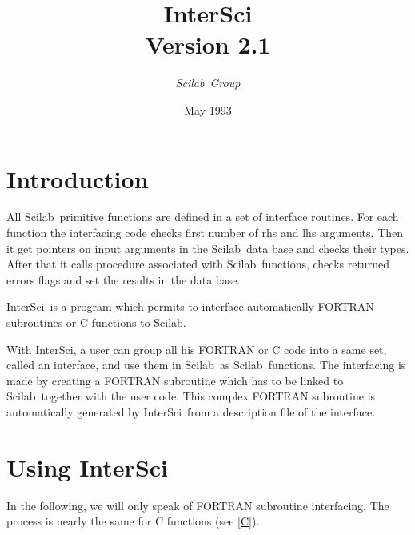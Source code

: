 \textheight=660pt \textwidth=470pt
\topmargin=-27pt
\oddsidemargin=0pt \evensidemargin=0pt \marginparwidth=60pt

\newcommand{\version}{Version 2.1}
\newcommand{\ISCI}{InterSci}
\newcommand{\SCI}{Scilab}
\newcommand{\T}[1]{{\tt #1}}
\newcommand{\M}[1]{$<${\em #1}$>$}
\newcommand{\ie}{\mbox{i.e.}}

\title{{\Huge\bf\ISCI}\\{\normalsize \version}}
\author{\Large\sl\SCI\ Group}
\date{May 1993}



\pagestyle{myheadings}
\markright{\ISCI\ \version}

\maketitle

\section{Introduction}
All \SCI\ primitive functions are defined in a set of interface
routines. For each function the interfacing code checks first number of
rhs and lhs arguments. Then  it get pointers on input arguments in the
\SCI\ data base and checks their types. After that it calls procedure
associated with \SCI\ functions, checks returned errors flags and set
the results in the data base.

\ISCI\ is a program which permits to interface automatically FORTRAN 
subroutines or C functions to \SCI.

With \ISCI, a user can group all his FORTRAN or C code into a same set,
called an interface, and use them in \SCI\ as \SCI\ functions. The interfacing
is made by creating a FORTRAN subroutine which has to be linked to
\SCI\ together 
with the user code. This complex FORTRAN subroutine is automatically generated
by \ISCI\ from a description file of the interface.


\section{Using \ISCI}
In the following, we will only speak of FORTRAN subroutine interfacing. The
process is nearly the same for C functions (see \ref{C}).

